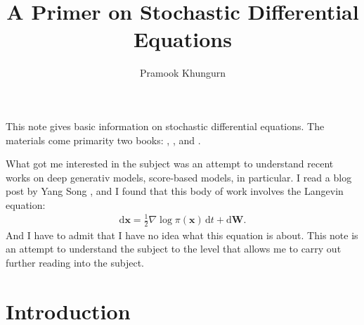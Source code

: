 \documentclass[10pt]{article}
\title{A Primer on Stochastic Differential Equations}
\author{Pramook Khungurn}
\newcommand{\dee}{\mathrm{d}}
\newcommand{\ve}[1]{\mathbf{#1}}
\begin{document}
\maketitle

This note gives basic information on stochastic differential equations. The materials come primarity two books: \cite{Evans:2013}, \cite{Morters:2012}, and \cite{Sarkka:2012}.

What got me interested in the subject was an attempt to understand recent works on deep generativ models, score-based models, in particular. I read a blog post by Yang Song \cite{Song:2021}, and I found that this body of work involves the Langevin equation:
\begin{align*}
  \dee\ve{x} = \frac{1}{2} \nabla \log \pi(\ve{x})\, \dee t + \dee\ve{W}.
\end{align*}
And I have to admit that I have no idea what this equation is about. This note is an attempt to understand the subject to the level that allows me to carry out further reading into the subject.

\section{Introduction}
\end{document}
